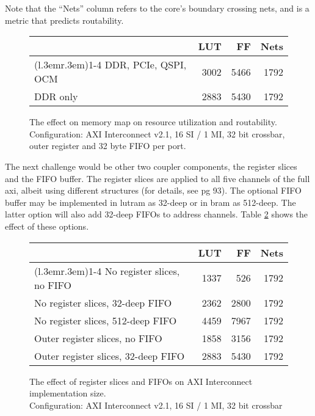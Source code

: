 Note that the ``Nets'' column refers to the core's boundary crossing nets,
and is a metric that predicts routability.

\begin{figure}[ht!]
\centering
\begin{tabular}{lrrr}
\toprule
			& LUT	& FF	& Nets \\
\cmidrule(l{.3em}r{.3em}){1-4}
DDR, PCIe, QSPI, OCM	& 3002	& 5466	& 1792\\
DDR only		& 2883	& 5430	& 1792\\
\bottomrule
\end{tabular}
\caption{The effect on memory map on resource utilization and routability.\\
	Configuration: AXI Interconnect v2.1, 16 SI / 1 MI, 32 bit crossbar, 
	outer register and 32 byte FIFO per port.}
\label{tab:int-mmu}
\end{figure}

The next challenge would be other two coupler components, the register slices
and the FIFO buffer. The register slices are applied to all five channels of the full \gls{axi},
albeit using different structures (for details, see \cite{pg059} pg 93).
The optional FIFO buffer may be implemented in \gls{lutram} as 32-deep or in \gls{bram} 
as 512-deep. The latter option will also add 32-deep FIFOs to address channels.
Table \ref{tab:int-reg} shows the effect of these options.

\begin{figure}[ht!]
\centering
\begin{tabular}{lrrr}
\toprule
	& LUT	& FF	& Nets \\
\cmidrule(l{.3em}r{.3em}){1-4}
No register slices, no FIFO		& 1337 & 526 & 1792 \\
No register slices, 32-deep FIFO	& 2362 & 2800 & 1792 \\
No register slices, 512-deep FIFO	& 4459 & 7967 & 1792 \\
Outer register slices, no FIFO		& 1858 & 3156 & 1792 \\
Outer register slices, 32-deep FIFO	& 2883 & 5430 & 1792 \\
\bottomrule
\end{tabular}
\caption{The effect of register slices and FIFOs on AXI Interconnect implementation size.\\
	Configuration: AXI Interconnect v2.1, 16 SI / 1 MI, 32 bit crossbar}
\label{tab:int-reg}
\end{figure}

